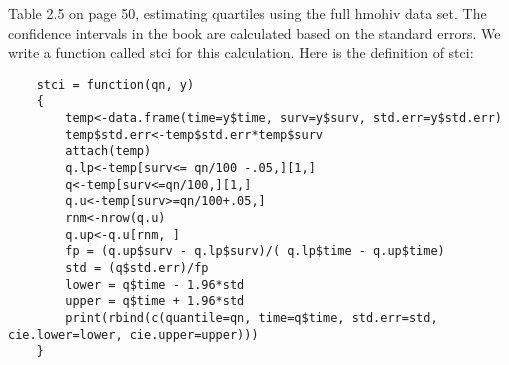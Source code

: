 \begin{frame}[fragile]	
	Table 2.5 on page 50, estimating quartiles using the full hmohiv data set. The confidence intervals in the book are calculated based on the standard errors. We write a function called stci for this calculation. Here is the definition of stci:
	
		\begin{framed}
		\begin{verbatim}
	stci = function(qn, y)
	{
		temp<-data.frame(time=y$time, surv=y$surv, std.err=y$std.err)
		temp$std.err<-temp$std.err*temp$surv 
		attach(temp)
		q.lp<-temp[surv<= qn/100 -.05,][1,]
		q<-temp[surv<=qn/100,][1,]
		q.u<-temp[surv>=qn/100+.05,]
		rnm<-nrow(q.u)
		q.up<-q.u[rnm, ]
		fp = (q.up$surv - q.lp$surv)/( q.lp$time - q.up$time)
		std = (q$std.err)/fp
		lower = q$time - 1.96*std
		upper = q$time + 1.96*std
		print(rbind(c(quantile=qn, time=q$time, std.err=std, cie.lower=lower, cie.upper=upper)))
	}
\end{verbatim}
\end{framed}
\end{frame}
